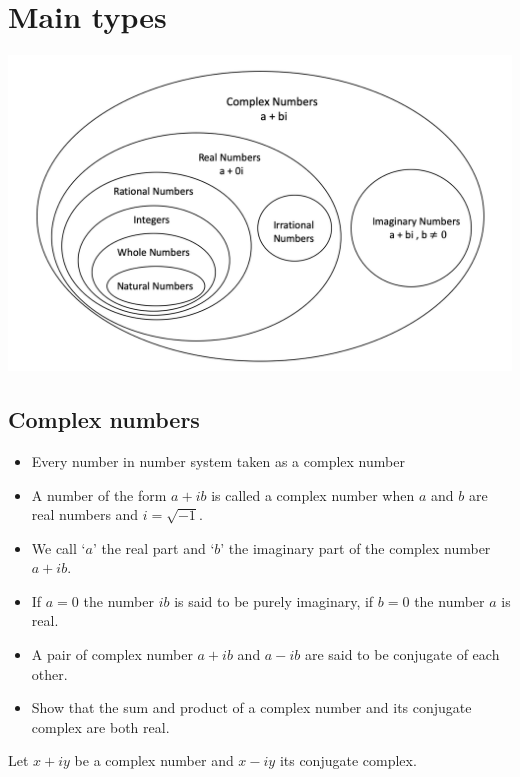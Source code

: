 \documentclass[]{book}
\providecommand{\tightlist}{%
  \setlength{\itemsep}{0pt}\setlength{\parskip}{0pt}}
\begin{document}
\hypertarget{main-types}{%
\section{Main types}\label{main-types}}

\begin{center}\includegraphics[width=1\linewidth]{figure/1-numbertypes} \end{center}

\hypertarget{complex-numbers}{%
\subsection{Complex numbers}\label{complex-numbers}}

\begin{itemize}
\tightlist
\item
  Every number in number system taken as a complex number
\item
  A number of the form \(a+ib\) is called a complex number when \(a\) and \(b\) are real numbers and \(i=\sqrt{-1}\).
\item
  We call `\(a\)' the real part and `\(b\)' the imaginary part of the complex number \(a+ib\).
\item
  If \(a=0\) the number \(ib\) is said to be purely imaginary, if \(b=0\) the number \(a\) is real.
\item
  A pair of complex number \(a+ib\) and \(a-ib\) are said to be conjugate of each other.
\item
  Show that the sum and product of a complex number and its conjugate complex are both real.
\end{itemize}

Let \(x+iy\) be a complex number and \(x-iy\) its conjugate complex.
\end{document}
